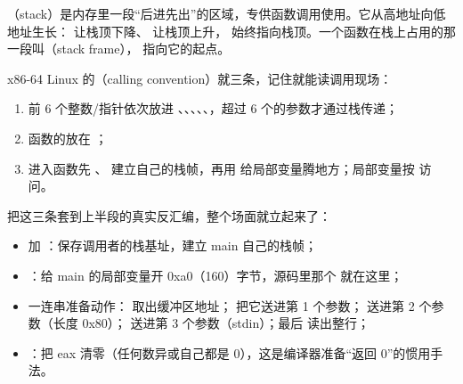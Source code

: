 \documentclass[UTF8,12pt,oneside]{ctexbook}
\begin{document}
（stack）是内存里一段“后进先出”的区域，专供函数调用使用。它从高地址向低地址生长： 让栈顶下降、 让栈顶上升， 始终指向栈顶。一个函数在栈上占用的那一段叫（stack frame）， 指向它的起点。

x86-64 Linux 的（calling convention）就三条，记住就能读调用现场：
\begin{enumerate}
\item 前 6 个整数/指针依次放进 、、、、、，超过 6 个的参数才通过栈传递；
\item 函数的放在 ；
\item 进入函数先 、 建立自己的栈帧，再用  给局部变量腾地方；局部变量按  访问。
\end{enumerate}

把这三条套到上半段的真实反汇编，整个场面就立起来了：
\begin{itemize}
\item {} 加 ：保存调用者的栈基址，建立 main 自己的栈帧；
\item {}：给 main 的局部变量开 0xa0（160）字节，源码里那个  就在这里；
\item 一连串准备动作： 取出缓冲区地址； 把它送进第 1 个参数； 送进第 2 个参数（长度 0x80）； 送进第 3 个参数（stdin）；最后  读出整行；
\item {}：把 eax 清零（任何数异或自己都是 0），这是编译器准备“返回 0”的惯用手法。
\end{itemize}


\end{document}
